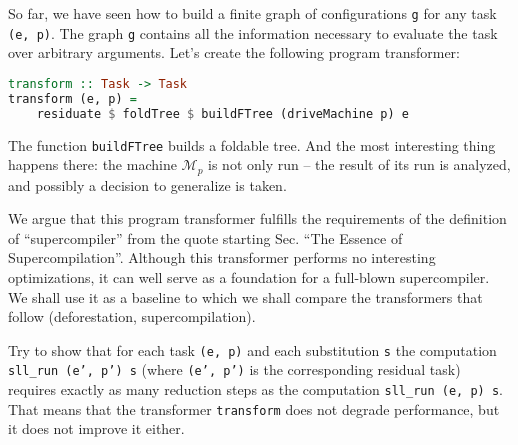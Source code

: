 So far, we have seen how to build a finite graph of configurations  \texttt{g} for any task \texttt{(e, p)}.
The graph \texttt{g} contains all the information necessary to evaluate the task over arbitrary arguments.
%
Let's create the following program transformer:
\begin{lstlisting}[language=haskell]
transform :: Task -> Task
transform (e, p) =
	residuate $ foldTree $ buildFTree (driveMachine p) e
\end{lstlisting}

The function \texttt{buildFTree} builds a foldable tree. 
And the most interesting thing happens there:
the machine $\mathcal{M}_p$ is not only run -- the result of its run
is analyzed, and possibly a decision to generalize is taken.

We argue that this program transformer fulfills the requirements of the
definition of ``supercompiler'' from the quote starting Sec. ``The Essence of Supercompilation''.
Although this transformer performs no interesting optimizations, it
can well serve as a foundation for a full-blown supercompiler.
We shall use it as a baseline to which we shall compare the
transformers that follow (deforestation, supercompilation).

\begin{exercise}
Try to show that for each task \texttt{(e, p)} and each substitution
\texttt{s} the computation \texttt{sll\_run (e', p') s} (where \texttt{(e', p')}
is the corresponding residual task) requires exactly as many reduction steps
as the computation \texttt{sll\_run (e, p) s}. 
That means that the transformer \texttt{transform} does not degrade performance,
but it does not improve it either.
\end{exercise}

